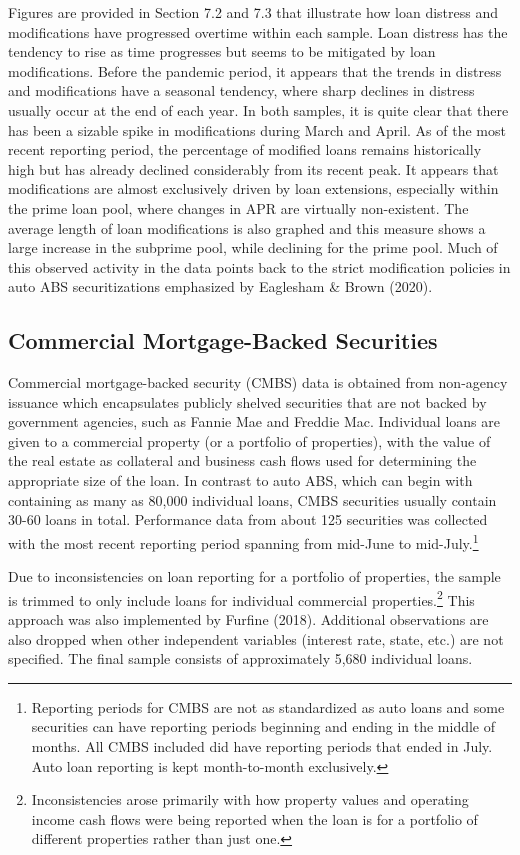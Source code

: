 \documentclass[10.5pt]{article}
\begin{document}
Figures are provided in Section 7.2 and 7.3 that illustrate how loan distress and modifications have progressed overtime within each sample. Loan distress has the tendency to rise as time progresses but seems to be mitigated by loan modifications. Before the pandemic period, it appears that the trends in distress and modifications have a seasonal tendency, where sharp declines in distress usually occur at the end of each year. In both samples, it is quite clear that there has been a sizable spike in modifications during March and April. As of the most recent reporting period, the percentage of modified loans remains historically high but has already declined considerably from its recent peak. It appears that modifications are almost exclusively driven by loan extensions, especially within the prime loan pool, where changes in APR are virtually non-existent. The average length of loan modifications is also graphed and this measure shows a large increase in the subprime pool, while declining for the prime pool. Much of this observed activity in the data points back to the strict modification policies in auto ABS securitizations emphasized by Eaglesham \& Brown (2020). 

\subsection{Commercial Mortgage-Backed Securities}

Commercial mortgage-backed security (CMBS) data is obtained from non-agency issuance which encapsulates publicly shelved securities that are not backed by government agencies, such as Fannie Mae and Freddie Mac. Individual loans are given to a commercial property (or a portfolio of properties), with the value of the real estate as collateral and business cash flows used for determining the appropriate size of the loan. In contrast to auto ABS, which can begin with containing as many as 80,000 individual loans, CMBS securities usually contain 30-60 loans in total. Performance data from about 125 securities was collected with the most recent reporting period spanning from mid-June to mid-July.\footnote{Reporting periods for CMBS are not as standardized as auto loans and some securities can have reporting periods beginning and ending in the middle of months. All CMBS included did have reporting periods that ended in July. Auto loan reporting is kept month-to-month exclusively.}

Due to inconsistencies on loan reporting for a portfolio of properties, the sample is trimmed to only include loans for individual commercial properties.\footnote{Inconsistencies arose primarily with how property values and operating income cash flows were being reported when the loan is for a portfolio of different properties rather than just one.} This approach was also implemented by Furfine (2018). Additional observations are also dropped when other independent variables (interest rate, state, etc.) are not specified. The final sample consists of approximately 5,680 individual loans. 
\end{document}
